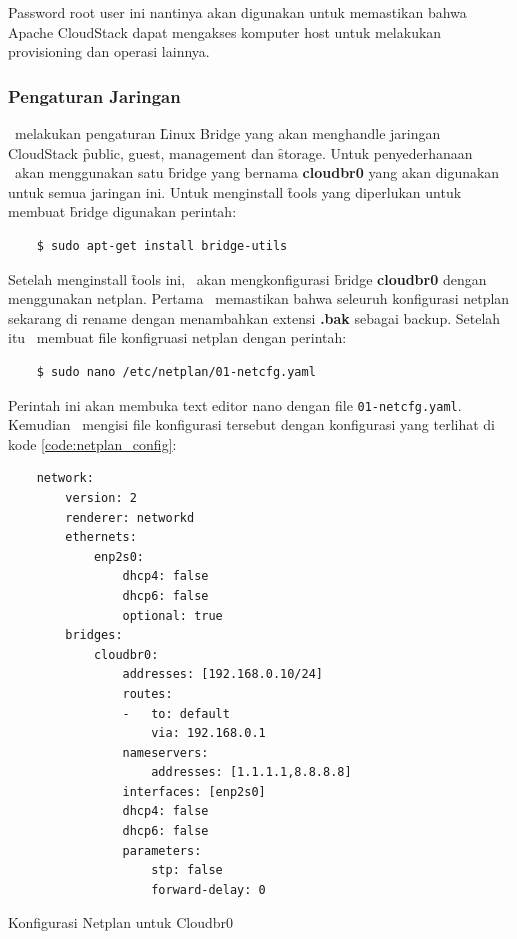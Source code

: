 Password root user ini nantinya akan digunakan untuk memastikan bahwa Apache CloudStack dapat mengakses komputer host untuk melakukan provisioning \vm dan operasi lainnya.
\subsubsection{Pengaturan Jaringan}
\saya\ melakukan pengaturan \f{Linux Bridge} yang akan menghandle jaringan CloudStack \f{public, guest, management} dan \f{storage}. Untuk penyederhanaan \saya\ akan menggunakan satu \f{bridge} yang bernama \textbf{cloudbr0} yang akan digunakan untuk semua jaringan ini. Untuk menginstall \f{tools} yang diperlukan untuk membuat \f{bridge} digunakan perintah:

\begin{listing}[H]
    \begin{verbatim}      
    $ sudo apt-get install bridge-utils
    \end{verbatim}
\end{listing}

Setelah menginstall \f{tools} ini, \saya\ akan mengkonfigurasi \f{bridge} \textbf{cloudbr0} dengan menggunakan netplan. Pertama \saya\ memastikan bahwa seleuruh konfigurasi netplan sekarang di rename dengan menambahkan extensi \textbf{.bak} sebagai backup. Setelah itu \saya\ membuat file konfigruasi netplan dengan perintah:

\begin{listing}[H]
    \begin{verbatim}     
    $ sudo nano /etc/netplan/01-netcfg.yaml
    \end{verbatim}
\end{listing}

Perintah ini akan membuka text editor nano dengan file \texttt{01-netcfg.yaml}. Kemudian \saya\ mengisi file konfigurasi tersebut dengan konfigurasi yang terlihat di kode \ref{code:netplan_config}:

\begin{listing}[H]
    \begin{verbatim}
    network:
        version: 2
        renderer: networkd
        ethernets:
            enp2s0:
                dhcp4: false
                dhcp6: false
                optional: true
        bridges:
            cloudbr0:
                addresses: [192.168.0.10/24]
                routes:
                -   to: default
                    via: 192.168.0.1
                nameservers:
                    addresses: [1.1.1.1,8.8.8.8]
                interfaces: [enp2s0]
                dhcp4: false
                dhcp6: false
                parameters:
                    stp: false
                    forward-delay: 0
    \end{verbatim}
    \caption{Konfigurasi Netplan untuk Cloudbr0}
    \label{code:netplan_config}
\end{listing}

